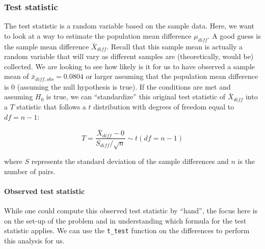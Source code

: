 \documentclass[12pt,]{krantz}
\makeatletter
\newenvironment{Shaded}{\begin{snugshade}}{\end{snugshade}}
\newcommand{\KeywordTok}[1]{\textcolor[rgb]{0.27,0.27,0.27}{\textbf{#1}}}
\newcommand{\DataTypeTok}[1]{\textcolor[rgb]{0.27,0.27,0.27}{#1}}
\newcommand{\DecValTok}[1]{\textcolor[rgb]{0.06,0.06,0.06}{#1}}
\newcommand{\StringTok}[1]{\textcolor[rgb]{0.5,0.5,0.5}{#1}}
\newcommand{\OtherTok}[1]{\textcolor[rgb]{0.37,0.37,0.37}{#1}}
\newcommand{\OperatorTok}[1]{\textcolor[rgb]{0.43,0.43,0.43}{\textbf{#1}}}
\newcommand{\NormalTok}[1]{#1}
\let\oldparagraph\paragraph
\renewcommand{\paragraph}[1]{\oldparagraph{#1}\mbox{}}
\newenvironment{kframe}{%
\medskip{}
\setlength{\fboxsep}{.8em}
 \def\at@end@of@kframe{}%
 \ifinner\ifhmode%
  \def\at@end@of@kframe{\end{minipage}}%
  \begin{minipage}{\columnwidth}%
 \fi\fi%
 \def\FrameCommand##1{\hskip\@totalleftmargin \hskip-\fboxsep
 \colorbox{shadecolor}{##1}\hskip-\fboxsep
     \hskip-\linewidth \hskip-\@totalleftmargin \hskip\columnwidth}%
 \MakeFramed {\advance\hsize-\width
   \@totalleftmargin\z@ \linewidth\hsize
   \@setminipage}}%
 {\par\unskip\endMakeFramed%
 \at@end@of@kframe}
\renewenvironment{Shaded}{\begin{kframe}}{\end{kframe}}
\theoremstyle{definition}
\theoremstyle{definition}
\theoremstyle{definition}
\theoremstyle{remark}
\makeatother
\begin{document}
\subsubsection*{Test statistic}\label{test-statistic-4}


The test statistic is a random variable based on the sample data. Here,
we want to look at a way to estimate the population mean difference
\(\mu_{diff}\). A good guess is the sample mean difference
\(\bar{X}_{diff}\). Recall that this sample mean is actually a random
variable that will vary as different samples are (theoretically, would
be) collected. We are looking to see how likely is it for us to have
observed a sample mean of \(\bar{x}_{diff, obs} = 0.0804\) or larger
assuming that the population mean difference is 0 (assuming the null
hypothesis is true). If the conditions are met and assuming \(H_0\) is
true, we can ``standardize'' this original test statistic of
\(\bar{X}_{diff}\) into a \(T\) statistic that follows a \(t\)
distribution with degrees of freedom equal to \(df = n - 1\):

\[ T =\dfrac{ \bar{X}_{diff} - 0}{ S_{diff} / \sqrt{n} } \sim t (df = n - 1) \]

where \(S\) represents the standard deviation of the sample differences
and \(n\) is the number of pairs.

\paragraph{Observed test statistic}\label{observed-test-statistic-4}

While one could compute this observed test statistic by ``hand'', the
focus here is on the set-up of the problem and in understanding which
formula for the test statistic applies. We can use the \texttt{t\_test}
function on the differences to perform this analysis for us.

\begin{Shaded}
\end{Shaded}
\end{document}
